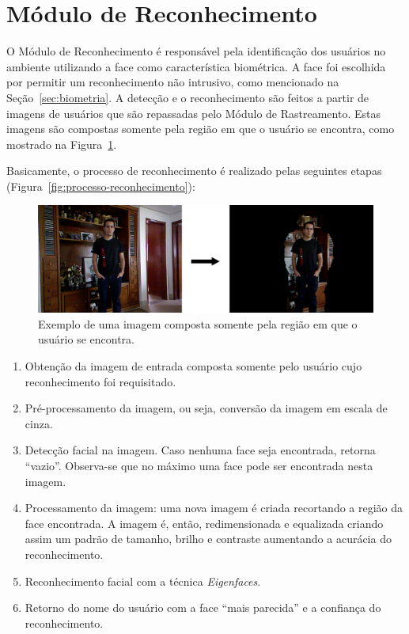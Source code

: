 \section{Módulo de Reconhecimento}

	O Módulo de Reconhecimento é responsável pela identificação dos usuários no
	ambiente utilizando a face como característica biométrica. A face foi escolhida
	por permitir um reconhecimento não intrusivo, como mencionado na
	Seção~\ref{sec:biometria}. A detecção e o reconhecimento são feitos a partir de
	imagens de usuários que são repassadas pelo Módulo de Rastreamento. Estas
	imagens são compostas somente pela região em que o usuário se encontra, como
	mostrado na Figura~\ref{fig:users-img}.

	Basicamente, o processo de reconhecimento é realizado pelas seguintes etapas
	(Figura~\ref{fig:processo-reconhecimento}):

		\begin{figure}[htb]
			\begin{center}
				\includegraphics[scale=0.3]{figuras/4.ProblemaEProposta/users-img.png}
			\end{center}
			\caption{Exemplo de uma imagem composta somente pela região em que o usuário se encontra.}
			\label{fig:users-img}
		\end{figure}

		\begin{enumerate}
			\item Obtenção da imagem de entrada composta somente pelo usuário cujo reconhecimento foi requisitado.
			\item Pré-processamento da imagem, ou seja, conversão da imagem em escala de cinza.
			\item Detecção facial na imagem. Caso nenhuma face seja encontrada, retorna ``vazio''. Observa-se que no máximo uma face pode ser encontrada nesta imagem.
			\item Processamento da imagem: uma nova imagem é criada recortando a região da face encontrada. A imagem é, então, redimensionada e equalizada criando assim um padrão de tamanho, brilho e contraste aumentando a acurácia do reconhecimento.
			\item Reconhecimento facial com a técnica \textit{Eigenfaces}.
			\item Retorno do nome do usuário com a face ``mais parecida'' e a confiança do reconhecimento.
		\end{enumerate}

